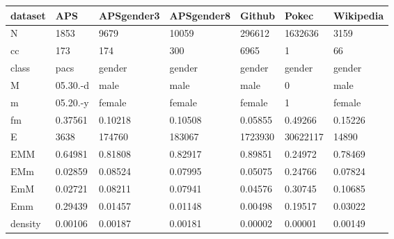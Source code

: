 \begin{tabular}{lllllll}
\toprule
dataset &       APS & APSgender3 & APSgender8 &   Github &     Pokec & Wikipedia \\
\midrule
N       &      1853 &       9679 &      10059 &   296612 &   1632636 &      3159 \\
cc      &       173 &        174 &        300 &     6965 &         1 &        66 \\
class   &      pacs &     gender &     gender &   gender &    gender &    gender \\
M       &  05.30.-d &       male &       male &     male &         0 &      male \\
m       &  05.20.-y &     female &     female &   female &         1 &    female \\
fm      &   0.37561 &    0.10218 &    0.10508 &  0.05855 &   0.49266 &   0.15226 \\
E       &      3638 &     174760 &     183067 &  1723930 &  30622117 &     14890 \\
EMM     &   0.64981 &    0.81808 &    0.82917 &  0.89851 &   0.24972 &   0.78469 \\
EMm     &   0.02859 &    0.08524 &    0.07995 &  0.05075 &   0.24766 &   0.07824 \\
EmM     &   0.02721 &    0.08211 &    0.07941 &  0.04576 &   0.30745 &   0.10685 \\
Emm     &   0.29439 &    0.01457 &    0.01148 &  0.00498 &   0.19517 &   0.03022 \\
density &   0.00106 &    0.00187 &    0.00181 &  0.00002 &   0.00001 &   0.00149 \\
\bottomrule
\end{tabular}
